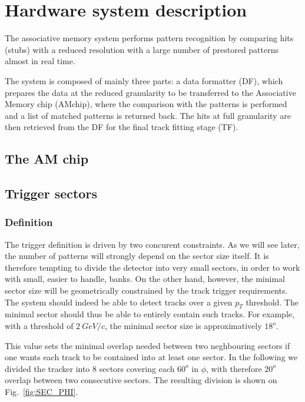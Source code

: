 \section{Hardware system description}
The associative memory system performs pattern recognition by comparing hits (stubs) with a reduced resolution with a large number
of prestored patterns almost in real time.

The system is composed of mainly three parts: a data formatter (DF), which prepares the data at the reduced granularity to be transferred 
to the Associative Memory chip (AMchip), where the comparison with the patterns is performed and a list of matched patterns
is returned back. The hits at full granularity are then retrieved from the DF for the final track fitting stage (TF).

\subsection{The AM chip}




\subsection{Trigger sectors}

\subsubsection{Definition}

\noindent The trigger definition is driven by two concurent constraints. As we will see later, the number of patterns will strongly depend on the sector size itself. It is therefore tempting to divide the detector into very small sectors, in order to work with small, easier to handle, banks. On the other hand, however, the minimal sector size will be geometrically constrained by the track trigger requirements. The system should indeed be able to detect tracks over a given $p_T$ threshold. The minimal sector should thus be able to entirely contain such tracks. For example, with a threshold of $2~GeV/c$, the minimal sector size is approximatively $18^{o}$.

\noindent This value sets the minimal overlap needed between two neghbouring sectors if one wants each track to be contained into at least one sector. In the following we divided the tracker into 8 sectors covering each $60^{o}$ in $\phi$, with therefore $20^{o}$ overlap between two consecutive sectors. The resulting division is shown on Fig.~\ref{fig:SEC_PHI}.


